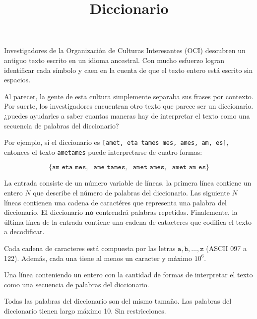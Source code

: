 \documentclass{oci}
\title{Diccionario}
\begin{document}
\begin{problemDescription}
Investigadores de la Organización de Culturas Interesantes (OCI) descubren un antiguo texto escrito en un idioma ancestral. Con mucho esfuerzo logran identificar cada símbolo y caen en la cuenta de que el texto entero está escrito sin espacios.

Al parecer, la gente de esta cultura simplemente separaba sus frases por contexto. Por suerte, los investigadores encuentran otro texto que parece ser un diccionario. ¿puedes ayudarles a saber cuantas maneras hay de interpretar el texto como una secuencia de palabras del diccionario?

Por ejemplo, si el diccionario es \texttt{[amet, eta tames mes, ames, am, es]}, entonces el texto \texttt{ametames} puede interpretarse de cuatro formas: 

$$\{\texttt{am eta mes},\ \ \  \texttt{ame tames},\ \ \  \texttt{amet ames},\ \ \  \texttt{amet am es}  \}$$


\end{problemDescription}

\begin{inputDescription}
La entrada consiste de un número variable de líneas. la primera línea contiene un entero $N$ que describe el número de palabras del diccionario. Las siguiente $N$ líneas contienen una cadena de caractéres que representa una palabra del diccionario. El diccionario $\textbf{no}$ contrendrá palabras repetidas. Finalemente, la última línea de la entrada contiene una cadena de catacteres que codifica el texto a decodificar. 

Cada cadena de caracteres está compuesta por las letras $\texttt{a},\texttt{b},\dots,\texttt{z}$ (ASCII 097 a 122). Además, cada una tiene al menos un caracter y máximo $10^6$.
\end{inputDescription}

\begin{outputDescription}
Una línea conteniendo un entero con la cantidad de formas de interpretar el texto como una secuencia de palabras del diccionario.
\end{outputDescription}

\begin{scoreDescription}
   Todas las palabras del diccionario son del mismo tamaño. 
   Las palabras del diccionario tienen largo máximo 10.
   Sin restricciones.
\end{scoreDescription}

\begin{sampleDescription}
\end{sampleDescription}
\end{document}
